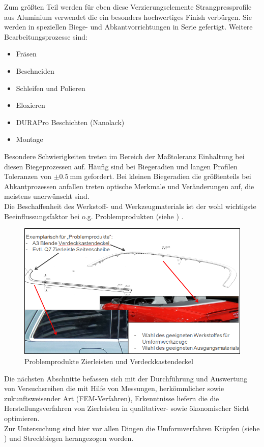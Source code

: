 \documentclass[12pt,a4paper,parskip]{scrartcl}
\begin{document}
Zum größten Teil werden für eben diese Verzierungselemente
Strangpressprofile aus Aluminium verwendet die ein besonders hochwertiges Finish verbürgen. Sie werden in speziellen Biege- und Abkantvorrichtungen in Serie gefertigt.
 Weitere Bearbeitungsprozesse sind: \begin{itemize}
 \item Fräsen
 \item Beschneiden
 \item Schleifen und Polieren
 \item Eloxieren
 \item DURAPro Beschichten (Nanolack)
 \item Montage
 \end{itemize}
   Besondere Schwierigkeiten treten im Bereich der Maßtoleranz Einhaltung bei diesen Biegeprozessen auf. Häufig sind bei  Biegeradien und langen Profilen Toleranzen von $\pm \SI{0.5}{\milli\meter}$ gefordert. Bei kleinen Biegeradien die größtenteils bei Abkantprozessen anfallen treten optische Merkmale und Veränderungen auf, die meistens unerwünscht sind.\\
 Die Beschaffenheit des Werkstoff- und Werkzeugmaterials ist der wohl wichtigste Beeinflussungsfaktor bei o.g. Problemprodukten (siehe ) .
 \begin{figure}[!htb]
 \centering
 \includegraphics[scale=.7]{ZierleisteVerdeckklappendeckel}
 \caption{Problemprodukte Zierleisten und Verdeckkastendeckel}
 \label{fig:Verdeckkastendeckel}
 \end{figure}

Die nächsten Abschnitte befassen sich mit der Durchführung und Auswertung von Versuchsreihen die mit Hilfe von Messungen, herkömmlicher sowie zukunftsweisender Art (FEM-Verfahren), Erkenntnisse liefern  die die Herstellungsverfahren von Zierleisten  in qualitativer- sowie ökonomischer Sicht  optimieren.\\
Zur Untersuchung   sind hier vor allen Dingen die Umformverfahren  Kröpfen (siehe )  und Streckbiegen herangezogen worden. 
\end{document}
